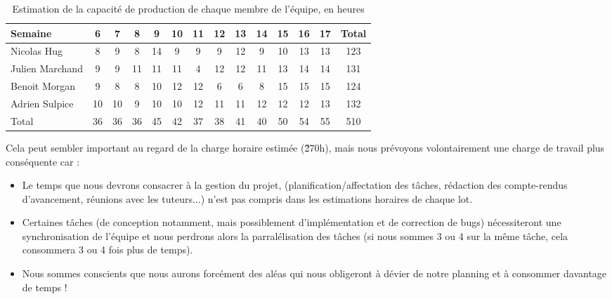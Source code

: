 \begin{table}[h]
\centering
\begin{tabular}{|l|c|c|c|c|c|c|c|c|c|c|c|c|c|}
  \hline
  \rowcolor{dark_grey} Semaine           &   6   &   7   &   8   &   9     &   10  &   11  &   12  &   13    &   14  &   15    &   16    &   17    &  Total \\
  \hline
  Nicolas Hug       &   8   &   9   &   8   &   14    &   9   &   9   &   9   &   12    &   9   &   10    &   13    &   13    &   123 \\
  \hline
  Julien Marchand   &   9   &   9   &   11  &   11    &   11  &   4   &   12  &   12    &   11  &   13    &   14    &   14    &   131 \\
  \hline
  Benoit Morgan     &   9   &   8   &   8   &   10    &   12  &   12  &   6   &   6     &   8   &   15    &   15    &   15    &   124 \\
  \hline
  Adrien Sulpice    &   10  &   10  &   9   &   10    &   10  &   12  &   11  &   11    &   12  &   12    &   12    &   13    &   132 \\
  \hline
  \rowcolor{dark_grey} Total             &   36  &   36  &   36  &   45    &   42  &   37  &   38  &   41    &   40  &   50    &   54    &   55    &   510  \\
  \hline
\end{tabular}
\caption{Estimation de la capacité de production de chaque membre de l'équipe, en heures}
\end{table}

\vspace{1em}

Cela peut sembler important au regard de la charge horaire estimée (\~270h), mais nous prévoyons volontairement une charge de travail plus conséquente car :
\begin{itemize}
\renewcommand{\labelitemi}{$\bullet$}
\item Le temps que nous devrons consacrer à la gestion du projet, (planification/affectation des tâches, rédaction des compte-rendus d'avancement, réunions avec les tuteurs...) n'est pas compris dans les estimations horaires de chaque lot.
\item Certaines tâches (de conception notamment, mais possiblement d'implémentation et de correction de bugs) nécessiteront une synchronisation de l'équipe et nous perdrons alors la parralélisation des tâches (si nous sommes 3 ou 4 sur la même tâche, cela consommera 3 ou 4 fois plus de temps).
\item Nous sommes conscients que nous aurons forcément des aléas qui nous obligeront à dévier de notre planning et à consommer davantage de temps ! 
\end{itemize}

